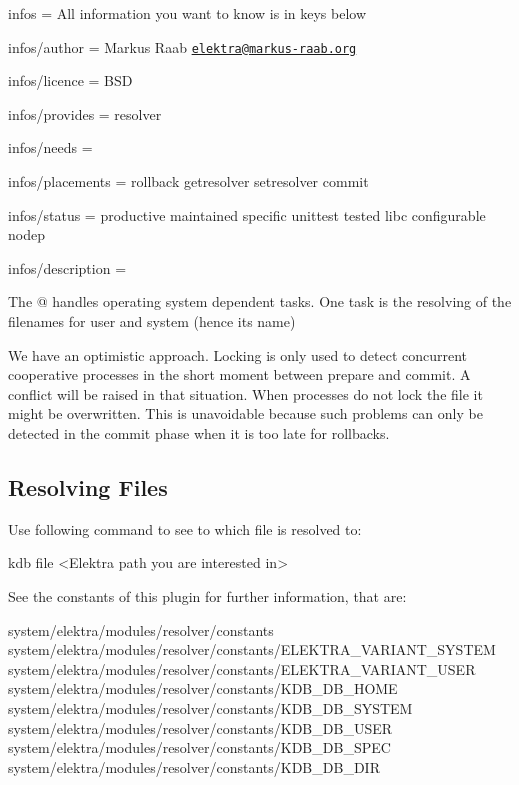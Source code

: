
\begin{DoxyItemize}
\item infos = All information you want to know is in keys below
\item infos/author = Markus Raab \href{mailto:elektra@markus-raab.org}{\tt elektra@markus-\/raab.\+org}
\item infos/licence = B\+S\+D
\item infos/provides = resolver
\item infos/needs =
\item infos/placements = rollback getresolver setresolver commit
\item infos/status = productive maintained specific unittest tested libc configurable nodep
\item infos/description = 
\end{DoxyItemize}

The @ handles operating system dependent tasks. One task is the resolving of the filenames for user and system (hence its name)

We have an optimistic approach. Locking is only used to detect concurrent cooperative processes in the short moment between prepare and commit. A conflict will be raised in that situation. When processes do not lock the file it might be overwritten. This is unavoidable because such problems can only be detected in the commit phase when it is too late for rollbacks.

\subsection*{Resolving Files}

Use following command to see to which file is resolved to\+: \begin{DoxyVerb}kdb file <Elektra path you are interested in>
\end{DoxyVerb}


See the constants of this plugin for further information, that are\+: \begin{DoxyVerb}system/elektra/modules/resolver/constants
system/elektra/modules/resolver/constants/ELEKTRA_VARIANT_SYSTEM
system/elektra/modules/resolver/constants/ELEKTRA_VARIANT_USER
system/elektra/modules/resolver/constants/KDB_DB_HOME
system/elektra/modules/resolver/constants/KDB_DB_SYSTEM
system/elektra/modules/resolver/constants/KDB_DB_USER
system/elektra/modules/resolver/constants/KDB_DB_SPEC
system/elektra/modules/resolver/constants/KDB_DB_DIR
\end{DoxyVerb}


